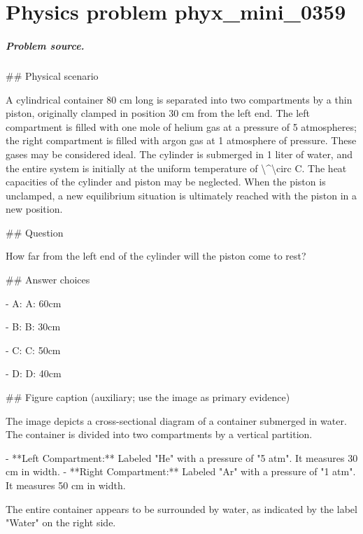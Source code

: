 
\chapter{Physics problem phyx\_mini\_0359}
\label{ch:PhyXMiniProblems_problem_phyx_mini_0359}

\paragraph{Problem source.}
\#\# Physical scenario

A cylindrical container 80 cm long is separated into two compartments by a thin piston, originally clamped in position 30 cm from the left end. The left compartment is filled with one mole of helium gas at a pressure of 5 atmospheres; the right compartment is filled with argon gas at 1 atmosphere of pressure. These gases may be considered ideal. The cylinder is submerged in 1 liter of water, and the entire system is initially at the uniform temperature of \textbackslash{}\textasciicircum{}\textbackslash{}circ C. The heat capacities of the cylinder and piston may be neglected. When the piston is unclamped, a new equilibrium situation is ultimately reached with the piston in a new position.

\#\# Question

How far from the left end of the cylinder will the piston come to rest?

\#\# Answer choices

- A: A: 60cm

- B: B: 30cm

- C: C: 50cm

- D: D: 40cm

\#\# Figure caption (auxiliary; use the image as primary evidence)

The image depicts a cross-sectional diagram of a container submerged in water. The container is divided into two compartments by a vertical partition.

- **Left Compartment:** Labeled "He" with a pressure of "5 atm". It measures 30 cm in width.
- **Right Compartment:** Labeled "Ar" with a pressure of "1 atm". It measures 50 cm in width.

The entire container appears to be surrounded by water, as indicated by the label "Water" on the right side.

